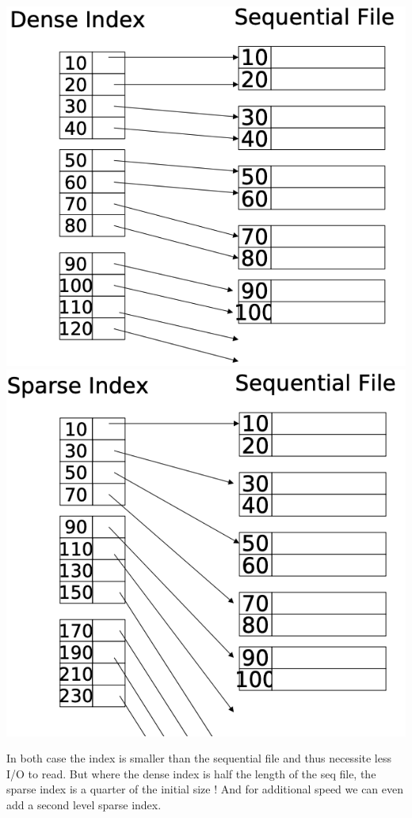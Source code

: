 \documentclass[12pt,a4paper]{article}
\begin{document}
\begin{center}
\includegraphics[scale=0.3]{img/img23.png}
\includegraphics[scale=0.3]{img/img24.png}
\end{center}
In both case the index is smaller than the sequential file and thus necessite less I/O to read. But where the dense index is half the length of the seq file, the sparse index is a quarter of the initial size ! And for additional speed we can even add a second level sparse index.
\end{document}

